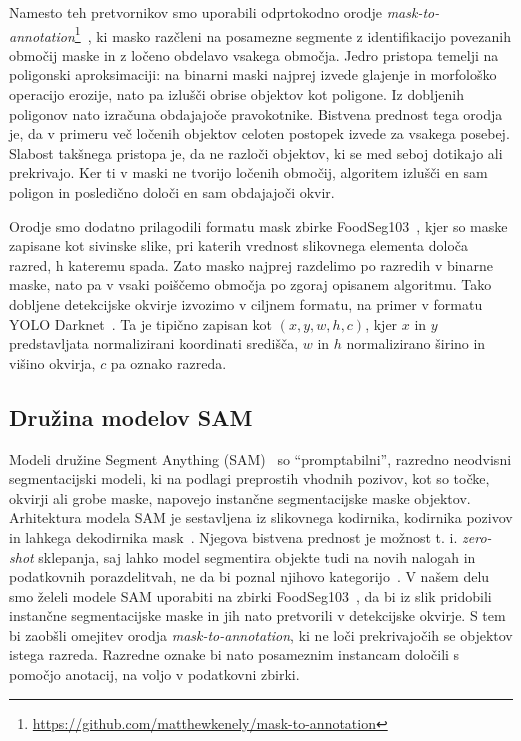\documentclass[a4paper,twoside,openright,12pt,slovene]{book}
\begin{document}
            Namesto teh pretvornikov smo uporabili odprtokodno orodje \emph{mask-to-annotation}\footnote{\url{https://github.com/matthewkenely/mask-to-annotation}}~\cite{src:seychell2023efficient-mask2annotation}, ki masko razčleni na posamezne segmente z identifikacijo povezanih območij maske in z ločeno obdelavo vsakega območja. Jedro pristopa temelji na poligonski aproksimaciji: na binarni maski najprej izvede glajenje in morfološko operacijo erozije, nato pa izlušči obrise objektov kot poligone. Iz dobljenih poligonov nato izračuna obdajajoče pravokotnike. Bistvena prednost tega orodja je, da v primeru več ločenih objektov celoten postopek izvede za vsakega posebej. 
            Slabost takšnega pristopa je, da ne razloči objektov, ki se med seboj dotikajo ali prekrivajo. Ker ti v maski ne tvorijo ločenih območij, algoritem izlušči en sam poligon in posledično določi en sam obdajajoči okvir.

            Orodje smo dodatno prilagodili formatu mask zbirke FoodSeg103~\cite{src:wu2021large}, kjer so maske zapisane kot sivinske slike, pri katerih vrednost slikovnega elementa določa razred, h kateremu spada. Zato masko najprej razdelimo po razredih v binarne maske, nato pa v vsaki poiščemo območja po zgoraj opisanem algoritmu. Tako dobljene detekcijske okvirje izvozimo v ciljnem formatu, na primer v formatu YOLO Darknet~\cite{src:yolodarknetformat}. Ta je tipično zapisan kot $(x, y, w, h, c)$, kjer $x$ in $y$ predstavljata normalizirani koordinati središča, $w$ in $h$ normalizirano širino in višino okvirja, $c$ pa oznako razreda.

        \subsection{Družina modelov SAM} \label{sct:metodologija-pretvorba-sam}

            Modeli družine Segment Anything (SAM)~\cite{src:kirillov2023segment} so \enquote{promptabilni}, razredno neodvisni segmentacijski modeli, ki na podlagi preprostih vhodnih pozivov, kot so točke, okvirji ali grobe maske, napovejo instančne segmentacijske maske objektov. Arhitektura modela SAM je sestavljena iz slikovnega kodirnika, kodirnika pozivov in lahkega dekodirnika mask~\cite{src:kirillov2023segment}. Njegova bistvena prednost je možnost t. i. \emph{zero-shot} sklepanja, saj lahko model segmentira objekte tudi na novih nalogah in podatkovnih porazdelitvah, ne da bi poznal njihovo kategorijo~\cite{src:kirillov2023segment}.
            V našem delu smo želeli modele SAM uporabiti na zbirki FoodSeg103~\cite{src:wu2021large}, da bi iz slik pridobili instančne segmentacijske maske in jih nato pretvorili v detekcijske okvirje. S tem bi zaobšli omejitev orodja \emph{mask-to-annotation}, ki ne loči prekrivajočih se objektov istega razreda. Razredne oznake bi nato posameznim instancam določili s pomočjo anotacij, na voljo v podatkovni zbirki.
\end{document}
